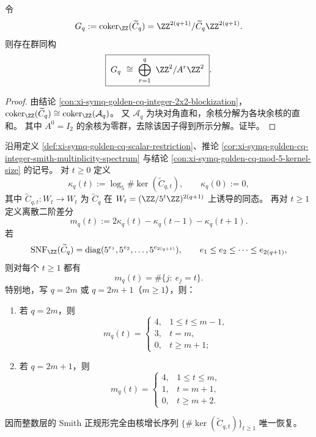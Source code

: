 \begin{conclusion}\label{con:xi-symq-golden-cq-integer-cokernel-block-decomposition}
令
\[
G_q:=\mathrm{coker}_{\ZZ}(\widetilde C_q)=\ZZ^{2(q+1)}/\widetilde C_q\ZZ^{2(q+1)}.
\]
则存在群同构
\[
\boxed{\;
G_q\ \cong\ \bigoplus_{r=1}^{q}\ \ZZ^{2}/A^{r}\ZZ^{2}\; }.
\]
\end{conclusion}
\begin{proof}
由结论 \ref{con:xi-symq-golden-cq-integer-2x2-blockization}，
\(
\mathrm{coker}_{\ZZ}(\widetilde C_q)\cong \mathrm{coker}_{\ZZ}(\mathcal A_q)
\)。
又 \(\mathcal A_q\) 为块对角直和，余核分解为各块余核的直和。
其中 \(A^0=I_2\) 的余核为零群，去除该因子得到所示分解。证毕。
\end{proof}

\begin{theorem}\label{thm:xi-symq-golden-cq-mod5-second-difference-smith}
沿用定义 \ref{def:xi-symq-golden-cq-scalar-restriction}、推论 \ref{cor:xi-symq-golden-cq-integer-smith-multiplicity-spectrum} 与结论 \ref{con:xi-symq-golden-cq-mod-5-kernel-size} 的记号。
对 \(t\ge 0\) 定义
\[
\kappa_q(t):=\log_5\#\ker(\widetilde C_{q,t}),
\qquad
\kappa_q(0):=0,
\]
其中 \(\widetilde C_{q,t}:W_t\to W_t\) 为 \(\widetilde C_q\) 在 \(W_t=(\ZZ/5^t\ZZ)^{2(q+1)}\) 上诱导的同态。
再对 \(t\ge 1\) 定义离散二阶差分
\[
m_q(t):=2\kappa_q(t)-\kappa_q(t-1)-\kappa_q(t+1).
\]
若
\[
\mathrm{SNF}_{\ZZ}(\widetilde C_q)
=
\operatorname{diag}(5^{e_1},5^{e_2},\dots,5^{e_{2(q+1)}}),
\qquad
e_1\le e_2\le \cdots\le e_{2(q+1)},
\]
则对每个 \(t\ge 1\) 都有
\[
\boxed{\;
m_q(t)=\#\{j:\ e_j=t\}.\;}
\]
特别地，写 \(q=2m\) 或 \(q=2m+1\)（\(m\ge 1\)），则：
\begin{enumerate}
  \item 若 \(q=2m\)，则
  \[
  m_q(t)=
  \begin{cases}
  4,&1\le t\le m-1,\\
  3,&t=m,\\
  0,&t\ge m+1;
  \end{cases}
  \]
  \item 若 \(q=2m+1\)，则
  \[
  m_q(t)=
  \begin{cases}
  4,&1\le t\le m,\\
  1,&t=m+1,\\
  0,&t\ge m+2.
  \end{cases}
  \]
\end{enumerate}
因而整数层的 Smith 正规形完全由核增长序列
\(
\{\#\ker(\widetilde C_{q,t})\}_{t\ge 1}
\)
唯一恢复。
\end{theorem}
